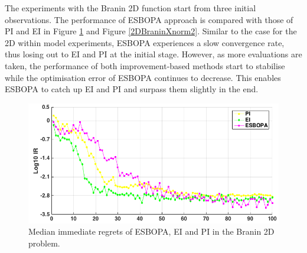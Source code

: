 \documentclass[a4paper,11pt]{report}
\begin{document}
\noindent
The experiments with the Branin 2D function start from three initial observations. The performance of ESBOPA approach is compared with those of PI and EI in Figure \ref{2DBraninIR} and Figure \ref{2DBraninXnorm2}.  Similar to the case for the 2D within model experiments, ESBOPA experiences a slow convergence rate, thus losing out to EI and PI at the initial stage. However,  as more evaluations are taken, the performance of both improvement-based methods start to stabilise while the optimisation error of ESBOPA continues to decrease. This enables ESBOPA to catch up EI and PI and surpass them slightly in the end. 
\\
\begin{figure} [H] \label{2DBraninIR}
	\centering
	 \includegraphics[width=0.8\linewidth]{2DBranin_ESBOPA_V4IR.png}
\caption{ Median immediate regrets of ESBOPA, EI and PI in the Branin 2D problem.}
\end{figure}
\end{document}
